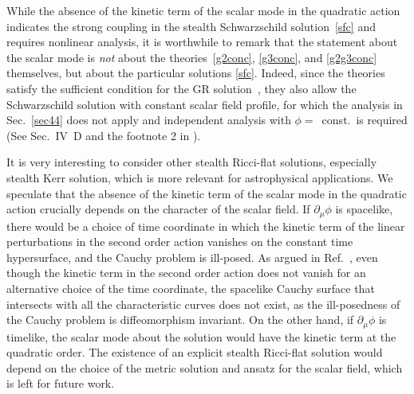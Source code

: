 \documentclass[prd,amsmath,amssymb,floatfix,superscriptaddress,notitlepage,nofootinbib,preprintnumbers]{revtex4-1}
\begin{document}
While the absence of the kinetic term of the scalar mode in the quadratic action indicates the strong coupling in the stealth Schwarzschild solution~\eqref{sfc} and requires nonlinear analysis, 
it is worthwhile to remark that 
the statement about the scalar mode is
{\it not} about the theories~\eqref{g2conc}, \eqref{g3conc}, and \eqref{g2g3conc} themselves,
but about the particular solutions \eqref{sfc}.
Indeed, since the theories satisfy the sufficient condition for the GR solution~\cite{Motohashi:2018wdq}, 
they also allow the Schwarzschild solution with constant scalar field profile, 
for which the analysis in Sec.~\ref{sec44} does not apply and independent analysis with $\phi=$~const.\ is required 
(See Sec.~IV~D and the footnote 2 in \cite{Kobayashi:2014wsa}).


It is very interesting to consider other stealth Ricci-flat solutions, 
especially stealth Kerr solution,
which is more relevant for astrophysical applications.
We speculate that 
the absence of the kinetic term of the scalar mode in the quadratic action
crucially depends on the character of the scalar field.
If $\partial_\mu \phi$ is spacelike,
there would be a choice of time coordinate 
in which 
the kinetic term of the linear perturbations in the second order action vanishes
on the constant time hypersurface,
and the Cauchy problem is ill-posed.
As argued in Ref.~\cite{Motloch:2015gta},
even though the kinetic term in the second order action does not vanish 
for an alternative choice of the time coordinate,
the spacelike Cauchy surface that intersects with 
all the characteristic curves does not exist, 
as the ill-posedness of the Cauchy problem is diffeomorphism invariant.
On the other hand,
if $\partial_\mu \phi$ is timelike,
the scalar mode about the solution would have the kinetic term at the quadratic order.
The existence of an explicit stealth Ricci-flat solution
would depend on the choice of the metric solution and ansatz for the scalar field,
which is left for future work.





\end{document}
